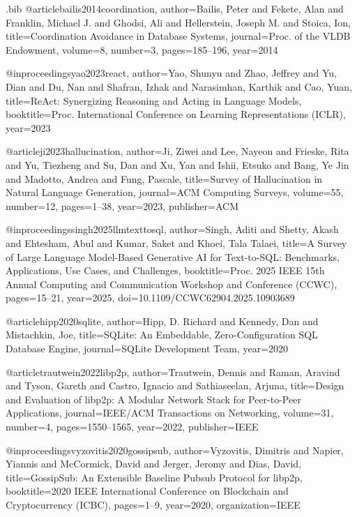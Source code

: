 \begin{filecontents*}{\jobname.bib}
@article{bailis2014coordination,
  author={Bailis, Peter and Fekete, Alan and Franklin, Michael J. and Ghodsi, Ali and Hellerstein, Joseph M. and Stoica, Ion},
  title={Coordination Avoidance in Database Systems},
  journal={Proc. of the VLDB Endowment},
  volume={8},
  number={3},
  pages={185--196},
  year={2014}
}

@inproceedings{yao2023react,
  author={Yao, Shunyu and Zhao, Jeffrey and Yu, Dian and Du, Nan and Shafran, Izhak and Narasimhan, Karthik and Cao, Yuan},
  title={{ReAct}: Synergizing Reasoning and Acting in Language Models},
  booktitle={Proc. International Conference on Learning Representations (ICLR)},
  year={2023}
}

@article{ji2023hallucination,
  author={Ji, Ziwei and Lee, Nayeon and Frieske, Rita and Yu, Tiezheng and Su, Dan and Xu, Yan and Ishii, Etsuko and Bang, Ye Jin and Madotto, Andrea and Fung, Pascale},
  title={Survey of Hallucination in Natural Language Generation},
  journal={ACM Computing Surveys},
  volume={55},
  number={12},
  pages={1--38},
  year={2023},
  publisher={ACM}
}

@inproceedings{singh2025llmtexttosql,
  author={Singh, Aditi and Shetty, Akash and Ehtesham, Abul and Kumar, Saket and Khoei, Tala Talaei},
  title={A Survey of Large Language Model-Based Generative {AI} for Text-to-{SQL}: Benchmarks, Applications, Use Cases, and Challenges},
  booktitle={Proc. 2025 IEEE 15th Annual Computing and Communication Workshop and Conference (CCWC)},
  pages={15--21},
  year={2025},
  doi={10.1109/CCWC62904.2025.10903689}
}

@article{hipp2020sqlite,
  author={Hipp, D. Richard and Kennedy, Dan and Mistachkin, Joe},
  title={{SQLite}: An Embeddable, Zero-Configuration {SQL} Database Engine},
  journal={SQLite Development Team},
  year={2020}
}

@article{trautwein2022libp2p,
  author={Trautwein, Dennis and Raman, Aravind and Tyson, Gareth and Castro, Ignacio and Sathiaseelan, Arjuna},
  title={Design and Evaluation of libp2p: A Modular Network Stack for Peer-to-Peer Applications},
  journal={IEEE/ACM Transactions on Networking},
  volume={31},
  number={4},
  pages={1550--1565},
  year={2022},
  publisher={IEEE}
}

@inproceedings{vyzovitis2020gossipsub,
  author={Vyzovitis, Dimitris and Napier, Yiannis and McCormick, David and Jerger, Jeromy and Dias, David},
  title={{GossipSub}: An Extensible Baseline Pubsub Protocol for libp2p},
  booktitle={2020 IEEE International Conference on Blockchain and Cryptocurrency (ICBC)},
  pages={1--9},
  year={2020},
  organization={IEEE}
}


\end{filecontents*}
